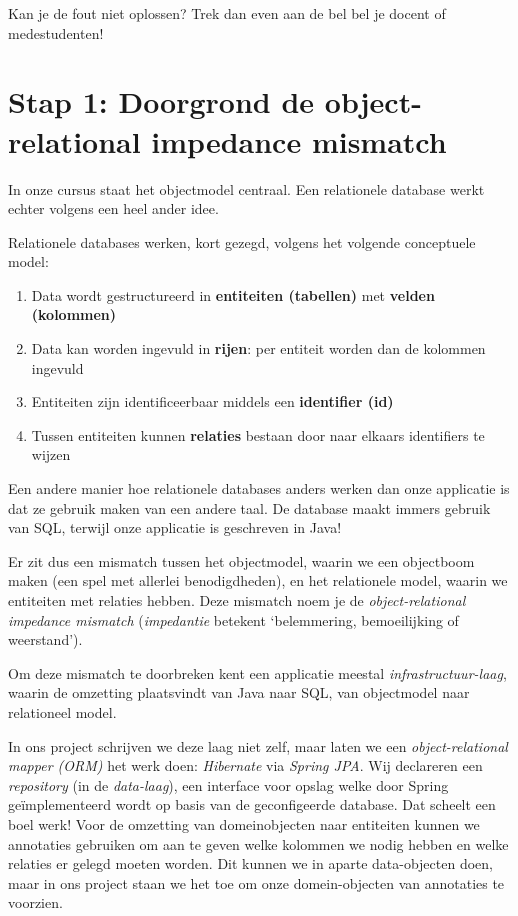 Kan je de fout niet oplossen? Trek dan even aan de bel bel je docent of medestudenten!

\section{Stap 1: Doorgrond de object-relational impedance mismatch}
In onze cursus staat het objectmodel centraal. Een relationele database 
werkt echter volgens een heel ander idee.

Relationele databases werken, kort gezegd, volgens het volgende conceptuele model:
\begin{enumerate}
    \item Data wordt gestructureerd in \textbf{entiteiten (tabellen)} met \textbf{velden (kolommen)}
    \item Data kan worden ingevuld in \textbf{rijen}: per entiteit worden dan de kolommen ingevuld
    \item Entiteiten zijn identificeerbaar middels een \textbf{identifier (id)}
    \item Tussen entiteiten kunnen \textbf{relaties} bestaan door naar elkaars identifiers te wijzen
\end{enumerate}

Een andere manier hoe relationele databases anders werken dan onze applicatie is dat 
ze gebruik maken van een andere taal. De database maakt immers gebruik van SQL, terwijl 
onze applicatie is geschreven in Java!

Er zit dus een mismatch tussen het objectmodel, 
waarin we een objectboom maken (een spel met allerlei benodigdheden),
en het relationele model, waarin we entiteiten met relaties hebben.
Deze mismatch noem je de \textit{object-relational impedance mismatch}
(\textit{impedantie} betekent `belemmering, bemoeilijking of weerstand').

Om deze mismatch te doorbreken kent een applicatie meestal
\textit{infrastructuur-laag}, 
waarin de omzetting plaatsvindt van Java naar SQL, 
van objectmodel naar relationeel model.

In ons project schrijven we deze laag niet zelf, maar laten we 
een \textit{object-relational mapper (ORM)} het werk doen: 
\textit{Hibernate} via \textit{Spring JPA}.
Wij declareren een \textit{repository} 
(in de \textit{data-laag}), 
een interface voor opslag welke door Spring geïmplementeerd wordt
op basis van de geconfigeerde database. Dat scheelt een boel werk!
Voor de omzetting van domeinobjecten naar entiteiten kunnen 
we annotaties gebruiken om aan te geven welke kolommen we nodig hebben en welke relaties er 
gelegd moeten worden. Dit kunnen we in aparte data-objecten doen, maar
in ons project staan we het toe om onze domein-objecten van annotaties te voorzien.

